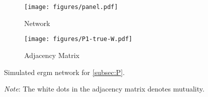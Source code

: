 \begin{figure}[t]
	\centering
	\begin{subfigure}{0.31\textwidth}
		\centering
		\texttt{[image: figures/panel.pdf]}
		\caption{Network}
	\end{subfigure}
	\begin{subfigure}{0.31\textwidth}
		\centering
		\texttt{[image: figures/P1-true-W.pdf]}
		\caption{Adjacency Matrix}
	\end{subfigure}
	\caption{Simulated \acrshort{ergm} network for \autoref{subsec:P}.}
	\label{fig:P}
	\caption*{\footnotesize\emph{Note}: The white dots in the adjacency matrix denotes mutuality.}
\end{figure}
